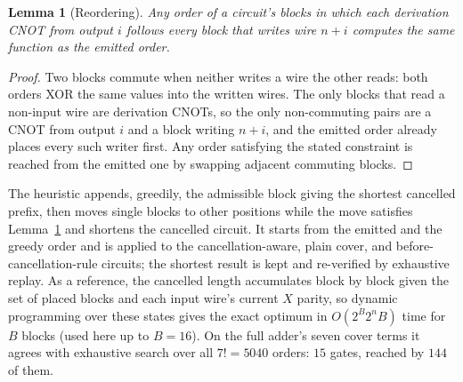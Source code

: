 \documentclass[conference]{IEEEtran}
\theoremstyle{plain}
\newtheorem{lemma}{Lemma}
\begin{document}
\begin{lemma}[Reordering]
\label{lem:reorder}
Any order of a circuit's blocks in which each derivation CNOT from output
$i$ follows every block that writes wire $n{+}i$ computes the same
function as the emitted order.
\end{lemma}
\begin{proof}
Two blocks commute when neither writes a wire the other reads: both
orders XOR the same values into the written wires. The only blocks that
read a non-input wire are derivation CNOTs, so the only non-commuting
pairs are a CNOT from output $i$ and a block writing $n{+}i$, and the
emitted order already places every such writer first. Any order
satisfying the stated constraint is reached from the emitted one by
swapping adjacent commuting blocks.
\end{proof}

The heuristic appends, greedily, the admissible block giving the
shortest cancelled prefix, then moves single blocks to other positions
while the move satisfies Lemma~\ref{lem:reorder} and shortens the
cancelled circuit. It starts from the emitted and the greedy order and is
applied to the cancellation-aware, plain cover, and
before-cancellation-rule circuits; the shortest result is kept and
re-verified by exhaustive replay. As a reference, the cancelled length
accumulates block by block given the set of placed blocks and each input
wire's current $X$ parity, so dynamic programming over these states gives
the exact optimum in $O(2^B 2^n B)$ time for $B$ blocks (used here up to
$B=16$). On the full adder's seven cover terms it agrees with exhaustive
search over all $7!=5040$ orders: $15$ gates, reached by $144$ of them.
\end{document}
